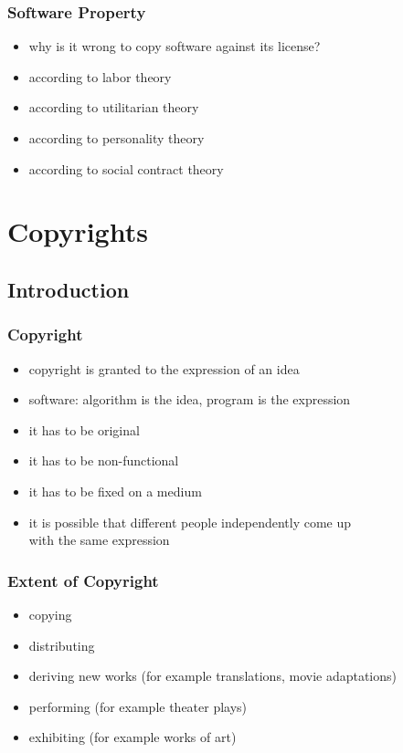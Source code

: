 \documentclass[dvipsnames]{beamer}
\theoremstyle{definition}
\theoremstyle{example}
\theoremstyle{plain}
\begin{document}
\begin{frame}
  \frametitle{Software Property}

  \begin{itemize}
    \item why is it wrong to copy software against its license?

    \pause
    \medskip
    \item according to labor theory

    \pause
    \item according to utilitarian theory

    \pause
    \item according to personality theory

    \pause
    \item according to social contract theory
  \end{itemize}
\end{frame}

\section{Copyrights}

\subsection{Introduction}

\begin{frame}
  \frametitle{Copyright}

  \begin{itemize}
    \item copyright is granted to the \alert{expression} of an idea
    \item software: algorithm is the idea, program is the expression

    \pause
    \medskip
    \item it has to be original
    \item it has to be non-functional
    \item it has to be fixed on a medium

    \pause
    \medskip
    \item it is possible that different people independently come up\\
      with the same expression
  \end{itemize}
\end{frame}

\begin{frame}
  \frametitle{Extent of Copyright}

  \begin{itemize}
    \item copying
    \item distributing
    \item deriving new works (for example translations, movie adaptations)
    \item performing (for example theater plays)
    \item exhibiting (for example works of art)
  \end{itemize}
\end{frame}
\end{document}

